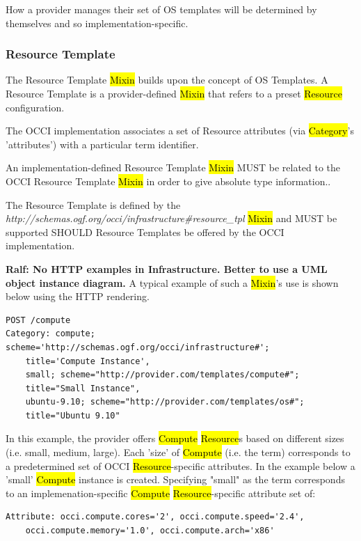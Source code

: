 \documentclass[10pt,a4paper]{article}
\begin{document}
How a provider manages their set of OS templates will be determined by themselves and so 
implementation-specific.

\subsubsection{Resource Template}
The Resource Template \hl{Mixin} builds upon the concept of OS Templates. A Resource Template is
a provider-defined \hl{Mixin} that refers to a preset \hl{Resource} configuration. 

The OCCI implementation associates a set of Resource attributes (via \hl{Category}'s 'attributes') with 
a particular term identifier. 

An implementation-defined Resource Template \hl{Mixin} MUST be related 
to the OCCI Resource Template \hl{Mixin} in order to give absolute type information.. 

The Resource Template is defined by the 
\textit{http://schemas.ogf.org/occi/infrastructure\#resource\_tpl} \hl{Mixin} and MUST be supported SHOULD Resource Templates be offered by the OCCI implementation.

{\bf Ralf: No HTTP examples in Infrastructure. Better to use a UML object instance diagram.}
A typical example of such a \hl{Mixin}'s use is shown below using the HTTP rendering. 

\begin{verbatim}
POST /compute
Category: compute; scheme='http://schemas.ogf.org/occi/infrastructure#'; 
    title='Compute Instance', 
    small; scheme="http://provider.com/templates/compute#"; 
    title="Small Instance", 
    ubuntu-9.10; scheme="http://provider.com/templates/os#"; 
    title="Ubuntu 9.10"
\end{verbatim}

In this example, the provider offers \hl{Compute} \hl{Resource}s based on different sizes (i.e. small,
medium, large). Each 'size' of \hl{Compute} (i.e. the term) corresponds to a predetermined set of OCCI 
\hl{Resource}-specific attributes. In the example below a 'small' \hl{Compute} instance is created. 
Specifying "small" as the term corresponds to an implemenation-specific \hl{Compute} \hl{Resource}-specific attribute set of:

\begin{verbatim}
Attribute: occi.compute.cores='2', occi.compute.speed='2.4', 
    occi.compute.memory='1.0', occi.compute.arch='x86'
\end{verbatim}
\end{document}
